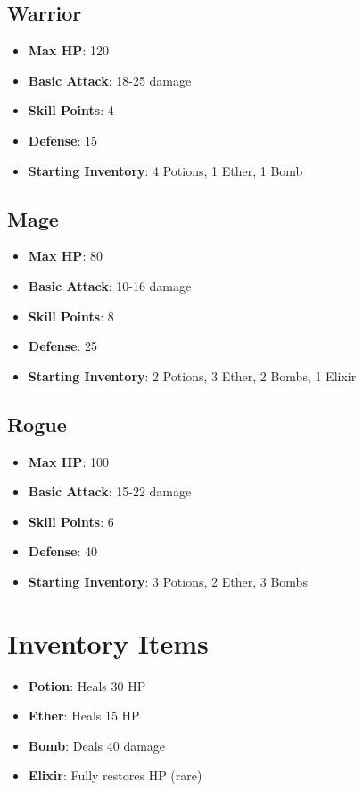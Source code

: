 \documentclass[12pt]{article}
\begin{document}
\subsection{Warrior}
\begin{itemize}
    \item \textbf{Max HP}: 120
    \item \textbf{Basic Attack}: 18-25 damage
    \item \textbf{Skill Points}: 4
    \item \textbf{Defense}: 15
    \item \textbf{Starting Inventory}: 4 Potions, 1 Ether, 1 Bomb
\end{itemize}

\subsection{Mage}
\begin{itemize}
    \item \textbf{Max HP}: 80
    \item \textbf{Basic Attack}: 10-16 damage
    \item \textbf{Skill Points}: 8
    \item \textbf{Defense}: 25
    \item \textbf{Starting Inventory}: 2 Potions, 3 Ether, 2 Bombs, 1 Elixir
\end{itemize}

\subsection{Rogue}
\begin{itemize}
    \item \textbf{Max HP}: 100
    \item \textbf{Basic Attack}: 15-22 damage
    \item \textbf{Skill Points}: 6
    \item \textbf{Defense}: 40
    \item \textbf{Starting Inventory}: 3 Potions, 2 Ether, 3 Bombs
\end{itemize}

\section{Inventory Items}
\label{sec:inventory}

\begin{itemize}
    \item \textbf{Potion}: Heals 30 HP
    \item \textbf{Ether}: Heals 15 HP
    \item \textbf{Bomb}: Deals 40 damage
    \item \textbf{Elixir}: Fully restores HP (rare)
\end{itemize}
\end{document}
